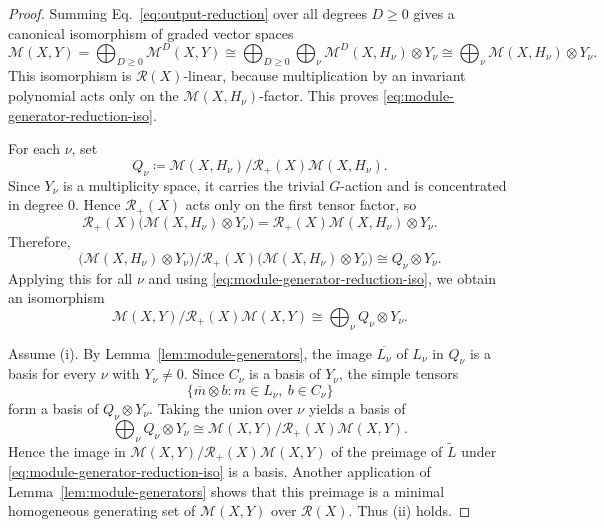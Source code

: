 \documentclass[11pt]{article}
\newcommand{\scM}{\mathcal{M}}
\newcommand{\scR}{\mathcal{R}}
\theoremstyle{definition}
\begin{document}
\begin{proof}
  Summing Eq.~\eqref{eq:output-reduction} over all degrees $D\ge 0$ gives a canonical isomorphism of graded vector spaces
  \[
    \scM(X,Y)
    =
    \bigoplus_{D\ge 0}\scM^D(X,Y)
    \cong
    \bigoplus_{D\ge 0}\bigoplus_{\nu}\scM^D(X,H_\nu)\otimes Y_\nu
    \cong
    \bigoplus_{\nu}\scM(X,H_\nu)\otimes Y_\nu.
  \]
  This isomorphism is $\scR(X)$-linear, because multiplication by an invariant polynomial acts only on the $\scM(X,H_\nu)$-factor. This proves \eqref{eq:module-generator-reduction-iso}.

  For each $\nu$, set
  \[
    Q_\nu\coloneq \scM(X,H_\nu)\big/\scR_{+}(X)\scM(X,H_\nu).
  \]
  Since $Y_\nu$ is a multiplicity space, it carries the trivial $G$-action and is concentrated in degree $0$. Hence $\scR_{+}(X)$ acts only on the first tensor factor, so
  \[
    \scR_{+}(X)\bigl(\scM(X,H_\nu)\otimes Y_\nu\bigr)
    =
    \scR_{+}(X)\scM(X,H_\nu)\otimes Y_\nu.
  \]
  Therefore,
  \[
    \bigl(\scM(X,H_\nu)\otimes Y_\nu\bigr)\Big/\scR_{+}(X)\bigl(\scM(X,H_\nu)\otimes Y_\nu\bigr)
    \cong
    Q_\nu\otimes Y_\nu.
  \]
  Applying this for all $\nu$ and using \eqref{eq:module-generator-reduction-iso}, we obtain an isomorphism
  \[
    \scM(X,Y)\big/\scR_{+}(X)\scM(X,Y)
    \cong
    \bigoplus_{\nu} Q_\nu\otimes Y_\nu.
  \]

  Assume \textup{(i)}. By Lemma~\ref{lem:module-generators}, the image $\overline{L_\nu}$ of $L_\nu$ in $Q_\nu$ is a basis for every $\nu$ with $Y_\nu\neq 0$. Since $C_\nu$ is a basis of $Y_\nu$, the simple tensors
  \[
    \{\overline{m}\otimes b : m\in L_\nu,\ b\in C_\nu\}
  \]
  form a basis of $Q_\nu\otimes Y_\nu$. Taking the union over $\nu$ yields a basis of
  \[
    \bigoplus_{\nu} Q_\nu\otimes Y_\nu
    \cong
    \scM(X,Y)\big/\scR_{+}(X)\scM(X,Y).
  \]
  Hence the image in $\scM(X,Y)/\scR_{+}(X)\scM(X,Y)$ of the preimage of $\widetilde L$ under \eqref{eq:module-generator-reduction-iso} is a basis. Another application of Lemma~\ref{lem:module-generators} shows that this preimage is a minimal homogeneous generating set of $\scM(X,Y)$ over $\scR(X)$. Thus \textup{(ii)} holds.


\end{proof}
\end{document}
